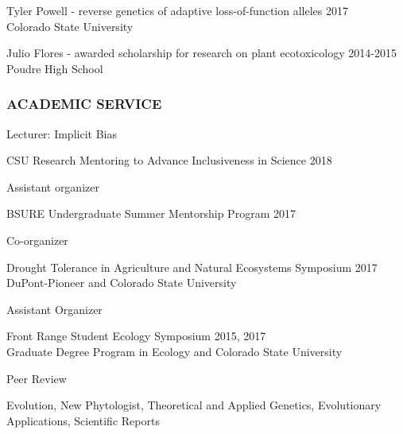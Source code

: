 \documentclass[12pt,english]{article}
\begin{document}
\hspace*{1.0em} Tyler Powell - reverse genetics of adaptive loss-of-function alleles
\hfill
2017\\
\hspace*{2.0em} Colorado State University

\hspace*{1.0em} Julio Flores - awarded scholarship for research on plant ecotoxicology
\hfill
2014-2015\\
\hspace*{2.0em} Poudre High School

\subsubsection*{ACADEMIC SERVICE}
\vspace{-0.5ex}\par

\hspace*{1.0em} Lecturer: Implicit Bias
\par
\hspace*{2.0em} CSU Research Mentoring to Advance Inclusiveness in Science
\hfill
2018

\hspace*{1.0em} Assistant organizer
\par
\hspace*{2.0em} BSURE Undergraduate Summer Mentorship Program
\hfill
2017

\hspace*{1.0em} Co-organizer
\par
\hspace*{2.0em} Drought Tolerance in Agriculture and Natural Ecosystems Symposium
\hfill
2017
\hspace*{2.0em} DuPont-Pioneer and Colorado State University
\par
\vspace{0.5em}
\hspace*{1.0em} Assistant Organizer
\par
\hspace*{2.0em} Front Range Student Ecology Symposium
\hfill
2015, 2017\\
\hspace*{2.0em} Graduate Degree Program in Ecology and Colorado State University
\par
\hspace*{1.0em} Peer Review
\par
\hspace*{2.0em} Evolution, New Phytologist, Theoretical and Applied Genetics, Evolutionary Applications, Scientific Reports
\end{document}
